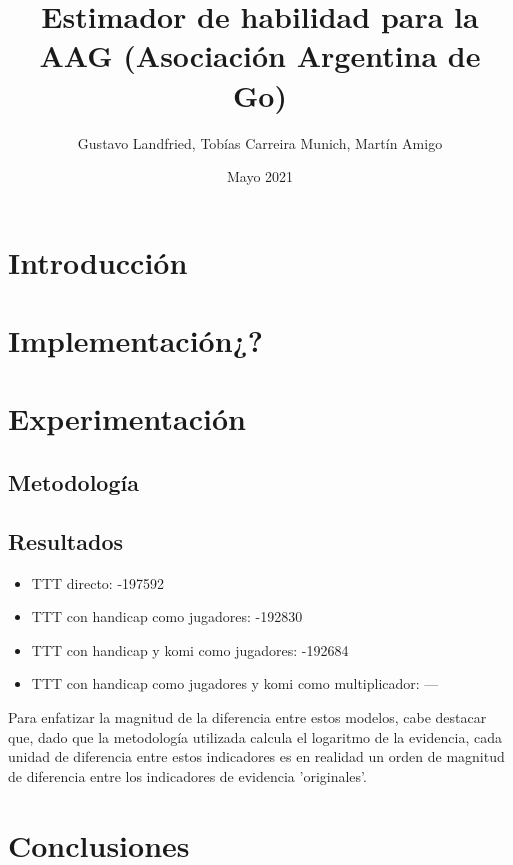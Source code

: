 \documentclass{article}
\title{Estimador de habilidad para la AAG (Asociación Argentina de Go)}
\author{Gustavo Landfried, Tobías Carreira Munich, Martín Amigo}
\date{Mayo 2021}
\begin{document}
\maketitle

\section{Introducción}

\section{Implementación¿?}


\section{Experimentación}

\subsection{Metodología}


\subsection{Resultados}
\begin{itemize}
    \item TTT directo: -197592
    \item TTT con handicap como jugadores: -192830
    \item TTT con handicap y komi como jugadores: -192684
    \item TTT con handicap como jugadores y komi como multiplicador: ---
 
\end{itemize}


Para enfatizar la magnitud de la diferencia entre estos modelos, cabe destacar que, dado que la metodología utilizada calcula el logaritmo de la evidencia, cada unidad de diferencia entre estos indicadores es en realidad un orden de magnitud de diferencia entre los indicadores de evidencia 'originales'. 





\section{Conclusiones}
\end{document}
